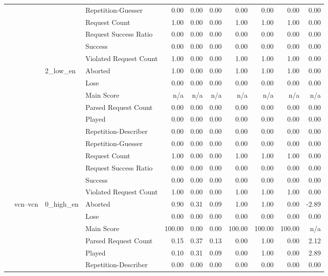 \begin{tabular}{llllrrrrrrr}
 &  &  & Repetition-Guesser & 0.00 & 0.00 & 0.00 & 0.00 & 0.00 & 0.00 & 0.00 \\
 &  &  & Request Count & 1.00 & 0.00 & 0.00 & 1.00 & 1.00 & 1.00 & 0.00 \\
 &  &  & Request Success Ratio & 0.00 & 0.00 & 0.00 & 0.00 & 0.00 & 0.00 & 0.00 \\
 &  &  & Success & 0.00 & 0.00 & 0.00 & 0.00 & 0.00 & 0.00 & 0.00 \\
 &  &  & Violated Request Count & 1.00 & 0.00 & 0.00 & 1.00 & 1.00 & 1.00 & 0.00 \\
\cline{3-11}
 &  & \multirow[t]{11}{*}{2_low_en} & Aborted & 1.00 & 0.00 & 0.00 & 1.00 & 1.00 & 1.00 & 0.00 \\
 &  &  & Lose & 0.00 & 0.00 & 0.00 & 0.00 & 0.00 & 0.00 & 0.00 \\
 &  &  & Main Score & n/a & n/a & n/a & n/a & n/a & n/a & n/a \\
 &  &  & Parsed Request Count & 0.00 & 0.00 & 0.00 & 0.00 & 0.00 & 0.00 & 0.00 \\
 &  &  & Played & 0.00 & 0.00 & 0.00 & 0.00 & 0.00 & 0.00 & 0.00 \\
 &  &  & Repetition-Describer & 0.00 & 0.00 & 0.00 & 0.00 & 0.00 & 0.00 & 0.00 \\
 &  &  & Repetition-Guesser & 0.00 & 0.00 & 0.00 & 0.00 & 0.00 & 0.00 & 0.00 \\
 &  &  & Request Count & 1.00 & 0.00 & 0.00 & 1.00 & 1.00 & 1.00 & 0.00 \\
 &  &  & Request Success Ratio & 0.00 & 0.00 & 0.00 & 0.00 & 0.00 & 0.00 & 0.00 \\
 &  &  & Success & 0.00 & 0.00 & 0.00 & 0.00 & 0.00 & 0.00 & 0.00 \\
 &  &  & Violated Request Count & 1.00 & 0.00 & 0.00 & 1.00 & 1.00 & 1.00 & 0.00 \\
\cline{2-11} \cline{3-11}
 & \multirow[t]{33}{*}{vcn--vcn} & \multirow[t]{11}{*}{0_high_en} & Aborted & 0.90 & 0.31 & 0.09 & 1.00 & 1.00 & 0.00 & -2.89 \\
 &  &  & Lose & 0.00 & 0.00 & 0.00 & 0.00 & 0.00 & 0.00 & 0.00 \\
 &  &  & Main Score & 100.00 & 0.00 & 0.00 & 100.00 & 100.00 & 100.00 & n/a \\
 &  &  & Parsed Request Count & 0.15 & 0.37 & 0.13 & 0.00 & 1.00 & 0.00 & 2.12 \\
 &  &  & Played & 0.10 & 0.31 & 0.09 & 0.00 & 1.00 & 0.00 & 2.89 \\
 &  &  & Repetition-Describer & 0.00 & 0.00 & 0.00 & 0.00 & 0.00 & 0.00 & 0.00 \\

\end{tabular}
